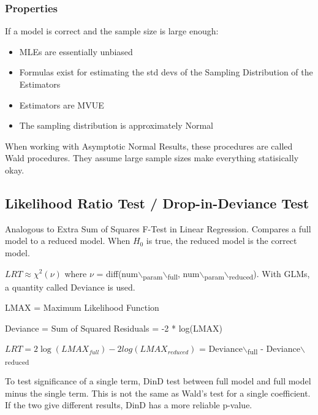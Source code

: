 \documentclass[11pt]{article}
\begin{document}
\subsubsection{Properties}
\label{sec:org08620d3}
If a model is correct and the sample size is large enough:
\begin{itemize}
\item MLEs are essentially unbiased
\item Formulas exist for estimating the std devs of the Sampling Distribution of the
Estimators
\item Estimators are MVUE
\item The sampling distribution is approximately Normal
\end{itemize}

When working with Asymptotic Normal Results, these procedures are called
Wald procedures. They assume large sample sizes make everything
statisically okay.

\subsection{Likelihood Ratio Test / Drop-in-Deviance Test}
\label{sec:orge7fb755}
Analogous to Extra Sum of Squares F-Test in Linear Regression. Compares
a full model to a reduced model. When \(H_0\) is true, the reduced model
is the correct model.

\(LRT \approx \chi^2(\nu)\) where \(\nu\) = diff(num$\backslash$\textsubscript{param}$\backslash$\textsubscript{full},
num$\backslash$\textsubscript{param}$\backslash$\textsubscript{reduced}). With GLMs, a quantity called Deviance is used.

LMAX = Maximum Likelihood Function

Deviance = Sum of Squared Residuals = -2 * log(LMAX)

\(LRT = 2 \log(LMAX_{full}) - 2log(LMAX_{reduced})\) = Deviance$\backslash$\textsubscript{full} -
Deviance$\backslash$\textsubscript{reduced}

To test significance of a single term, DinD test between full model and
full model minus the single term. This is not the same as Wald's test
for a single coefficient. If the two give different results, DinD has a
more reliable p-value.
\end{document}
